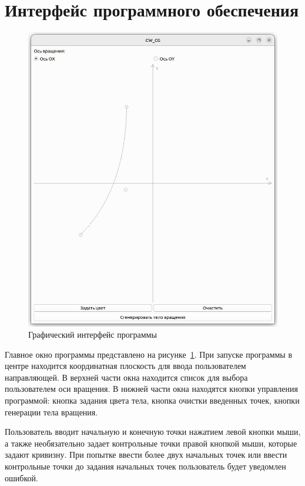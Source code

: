 \section{Интерфейс программного обеспечения}
\begin{figure}[H]
	\centering
	\includegraphics[scale=0.4]{img/inter_1.png}
	\caption{Графический интерфейс программы}
	\label{fig:main_window}
\end{figure}
Главное окно программы представлено на рисунке~\ref{fig:main_window}. При запуске программы в центре находится координатная плоскость для ввода пользователем направляющей. В верхней части окна находится список для выбора пользователем оси вращения. В нижней части окна находятся кнопки управления программой: кнопка задания цвета тела, кнопка очистки введенных точек, кнопки генерации тела вращения.

Пользователь вводит начальную и конечную точки нажатием левой кнопки мыши, а также необязательно задает контрольные точки правой кнопкой мыши, которые задают кривизну. При попытке ввести более двух начальных точек или ввести контрольные точки до задания начальных точек пользователь будет уведомлен ошибкой.


